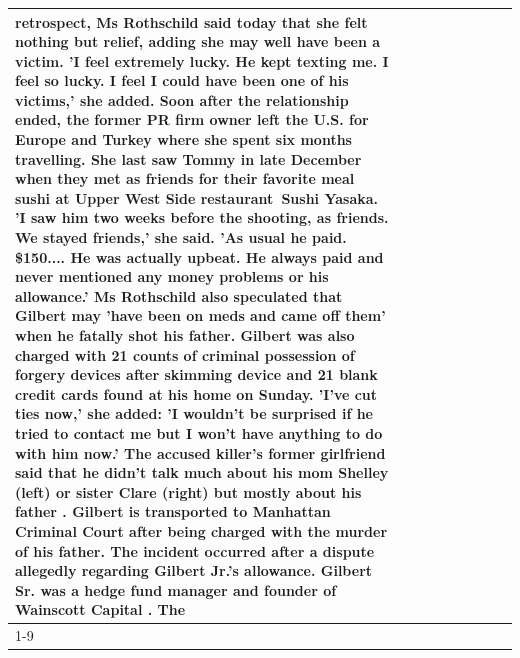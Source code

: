 \begin{table}[H]
\begin{tabular}{lllrlllll}
retrospect, Ms Rothschild said today that she felt nothing but relief, adding she may well have been a victim. 'I feel extremely lucky. He kept texting me. I feel so lucky. I feel I could have been one of his victims,' she added. Soon after the relationship ended, the former PR firm owner left the U.S. for Europe and Turkey where she spent six months  travelling. She last saw Tommy in late December when they met as friends for their favorite meal sushi at Upper West Side restaurant Sushi Yasaka. 'I saw him two weeks before the shooting, as friends. We stayed friends,' she said. 'As usual he paid. \$150.... He was actually upbeat. He always paid and never mentioned any money problems or his allowance.' Ms Rothschild also speculated that Gilbert may 'have been on meds and came off them' when he fatally shot his father. Gilbert was also charged with 21 counts of criminal possession of forgery devices after skimming device and 21 blank credit cards found at his home on Sunday. 'I've cut ties now,' she added: 'I wouldn’t be surprised if he tried to contact me but I won’t have anything to do with him now.' The accused killer's former girlfriend said that he didn't talk much about his mom Shelley (left) or sister Clare (right) but mostly about his father . Gilbert is transported to Manhattan Criminal Court  after being charged with the murder of his father. The incident occurred after a dispute allegedly regarding Gilbert Jr.'s allowance. Gilbert Sr. was a hedge fund manager and founder of Wainscott Capital . The \\
\cline{1-9}

\end{tabular}
\end{table}
